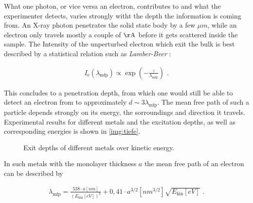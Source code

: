 \documentclass[numbers=noenddot,a4paper]{article}
\newcommand{\ix}[1]{_\text{#1}}
\newcommand{\tilt}[1]{\textit{#1}}
\begin{document}
			What one photon, or vice versa an electron, contributes to and what the experimenter detects, varies strongly witht the depth the information is coming from. An X-ray photon penetrates the solid state body by a few $\unit{\mu m}$, while an electron only travels mostly a couple of $\unit{\AA}$ before it gets scattered inside the sample. The Intensity of the unperturbed electron which exit the bulk is best described by a statistical relation such as \tilt{Lamber-Beer} \cite{XPSRa}:

				\begin{align}
					I\ix{e}(\lambda\ix{mfp})\propto\exp\left(-\frac{z}{\lambda\ix{mfp}}\right)\,\, .\label{eq:weg}
				\end{align}

			This concludes to a penetration depth, from which one would still be able to detect an electron from to approximately $d\sim3\lambda\ix{mfp}$. The mean free path of such a particle depends strongly on its energy, the sorroundings and direction it travels. Experimental results for different metals and the excitation depths, as well as corresponding energies is shown in \autoref{img:tiefe}.

				\begin{figure}[h]
					\centering
					\caption{Exit depths of different metals over kinetic energy.\cite{XPSalt}}\label{img:tiefe}
				\end{figure}

			In such metals with the monolayer thickness $a$ the mean free path of an electron can be described by \cite{XPSRapha}

				\begin{align}
					\lambda\ix{mfp}=\frac{538\cdot a\unit{[nm]}}{(E\ix{kin}\unit{[eV]})^2}+0,41\cdot a^{3/2}\unit{[nm^{3/2}]}\sqrt{E\ix{kin}\unit{[eV]}} \,\,.\label{eq:mfp}
				\end{align}
\end{document}
